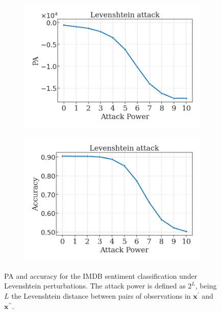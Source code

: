 \begin{figure}[H]
    \centering
    \begin{subfigure}[b]{0.45\textwidth}
        \centering
        \includegraphics[width=\textwidth]{img/results_discussion/empirical/levenshtein_logPA.png}
    \end{subfigure}
    \hfill
    \begin{subfigure}[b]{0.45\textwidth}
        \centering
        \includegraphics[width=\textwidth]{img/results_discussion/empirical/levenshtein_AFR_true.png}
    \end{subfigure}
    \caption{PA and accuracy for the IMDB sentiment classification under Levenshtein perturbations.
    The attack power is defined as $2^L$, being $L$ the Levenshtein distance between pairs of
    observations in $\bm{x}^\prime$ and $\bm{x}^{\prime\prime}$.}
    \label{fig:imdb_levenshtein}
\end{figure}

